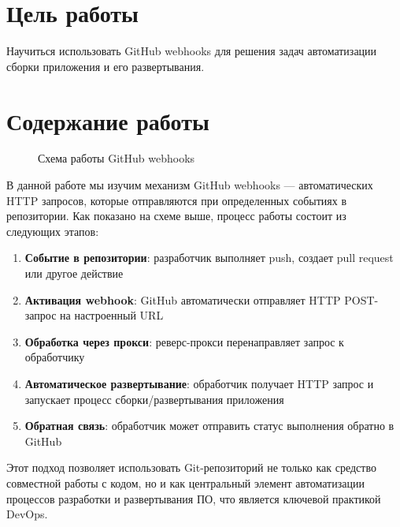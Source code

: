\documentclass[12pt,a4paper]{article}
\begin{document}
\makelabcover

\commoninstructions

\section{Цель работы}

Научиться использовать GitHub webhooks для решения задач автоматизации сборки приложения и его развертывания.

\section{Содержание работы}

%
%
%
%
\begin{figure}[H]
\centering

\caption{Схема работы GitHub webhooks}
\label{fig:webhooks-schema}
\end{figure}

В данной работе мы изучим механизм GitHub webhooks — автоматических HTTP запросов, которые отправляются при определенных событиях в репозитории.
Как показано на схеме выше, процесс работы состоит из следующих этапов:
\begin{enumerate}
    \item \textbf{Событие в репозитории}: разработчик выполняет push, создает pull request или другое действие
    \item \textbf{Активация webhook}: GitHub автоматически отправляет HTTP POST-запрос на настроенный URL
    \item \textbf{Обработка через прокси}: реверс-прокси перенаправляет запрос к обработчику
    \item \textbf{Автоматическое развертывание}: обработчик получает HTTP запрос и запускает процесс сборки/развертывания приложения
    \item \textbf{Обратная связь}: обработчик может отправить статус выполнения обратно в GitHub
\end{enumerate}

Этот подход позволяет использовать Git-репозиторий не только как средство совместной работы с кодом, но и как центральный
элемент автоматизации процессов разработки и развертывания ПО, что является ключевой практикой DevOps.
\end{document}
